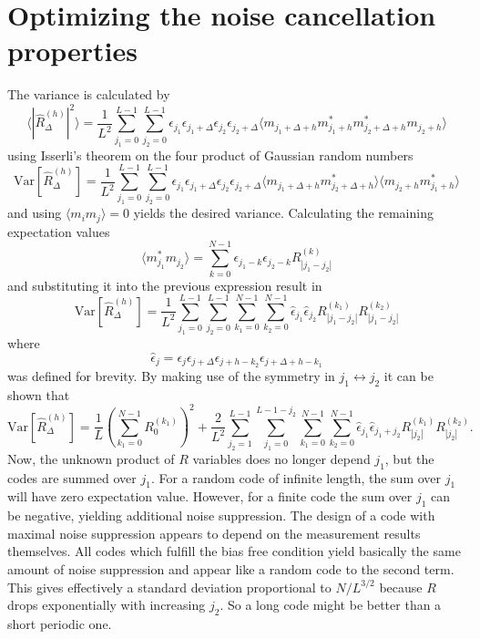 \documentclass[18pt,a4paper]{extarticle}
\begin{document}
\section{Optimizing the noise cancellation properties}
The variance is calculated by
\begin{equation}
\langle |\hat{R}^{(h)}_\Delta|^2 \rangle = \frac{1}{L^2}\sum^{L-1}_{j_1=0}\sum^{L-1}_{j_2=0}
\epsilon_{j_1} \epsilon_{j_1 + \Delta}
\epsilon_{j_2} \epsilon_{j_2 + \Delta}
\langle
m_{j_1 + \Delta + h} m_{j_1 + h}^*
m_{j_2 + \Delta + h}^* m_{j_2 + h}
\rangle
\end{equation}
using Isserli's theorem on the four product of Gaussian random numbers
\begin{equation}
\mathrm{Var}[ \hat{R}^{(h)}_\Delta ] = \frac{1}{L^2}\sum^{L-1}_{j_1=0}\sum^{L-1}_{j_2=0}
\epsilon_{j_1} \epsilon_{j_1 + \Delta}
\epsilon_{j_2} \epsilon_{j_2 + \Delta}
\langle m_{j_1 + \Delta + h} m_{j_2 + \Delta + h}^* \rangle
\langle m_{j_2 + h} m_{j_1 + h}^* \rangle
\end{equation}
and using $\langle m_i m_j \rangle = 0$ yields the desired variance.
Calculating the remaining expectation values
\begin{equation}
\langle m_{j_1}^*m_{j_2} \rangle = \sum_{k=0}^{N-1} \epsilon_{j_1-k} \epsilon_{j_2-k} R_{|j_1-j_2|}^{(k)}
\end{equation}
and substituting it into the previous expression result in
\begin{equation}
\mathrm{Var}[ \hat{R}^{(h)}_\Delta ] =
\frac{1}{L^2}\sum^{L-1}_{j_1=0}\sum^{L-1}_{j_2=0}\sum_{k_1=0}^{N-1}\sum_{k_2=0}^{N-1}
\hat{\epsilon}_{j_1}\hat{\epsilon}_{j_2} R_{|j_1-j_2|}^{(k_1)} R_{|j_1-j_2|}^{(k_2)}
\end{equation}
where
\begin{equation}
\hat{\epsilon}_j = \epsilon_j \epsilon_{j + \Delta} \epsilon_{j + h - k_2} \epsilon_{j + \Delta + h - k_1}
\end{equation}
was defined for brevity.
By making use of the symmetry in $j_1 \leftrightarrow j_2$ it can be shown that
\begin{equation}
\mathrm{Var}[ \hat{R}^{(h)}_\Delta ] = \frac{1}{L}\left(\sum_{k_1=0}^{N-1} R_{0}^{(k_1)} \right)^2 +
\frac{2}{L^2}\sum^{L-1}_{j_2=1}\sum^{L-1-j_2}_{j_1=0}\sum_{k_1=0}^{N-1}\sum_{k_2=0}^{N-1}
\hat{\epsilon}_{j_1}\hat{\epsilon}_{j_1+j_2} R_{|j_2|}^{(k_1)} R_{|j_2|}^{(k_2)}.
\end{equation}
Now, the unknown product of $R$ variables does no longer depend $j_1$, but the codes are summed over $j_1$.
For a random code of infinite length, the sum over $j_1$ will have zero expectation value.
However, for a finite code the sum over $j_1$ can be negative, yielding additional noise suppression.
The design of a code with maximal noise suppression appears to depend on the measurement results themselves.
All codes which fulfill the bias free condition yield basically the same amount of noise suppression and appear like a random code to the second term.
This gives effectively a standard deviation proportional to $N/L^{3/2}$ because $R$ drops exponentially with increasing $j_2$.
So a long code might be better than a short periodic one.
\end{document}
